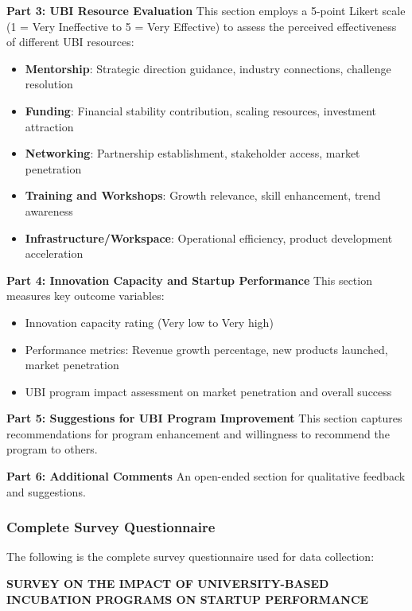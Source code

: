 \documentclass[../Main.tex]{subfiles}%
\begin{document}
	\textbf{Part 3: UBI Resource Evaluation}
	This section employs a 5-point Likert scale (1 = Very Ineffective to 5 = Very Effective) to assess the perceived effectiveness of different UBI resources:
	\begin{itemize}
		\item \textbf{Mentorship}: Strategic direction guidance, industry connections, challenge resolution
		\item \textbf{Funding}: Financial stability contribution, scaling resources, investment attraction
		\item \textbf{Networking}: Partnership establishment, stakeholder access, market penetration
		\item \textbf{Training and Workshops}: Growth relevance, skill enhancement, trend awareness
		\item \textbf{Infrastructure/Workspace}: Operational efficiency, product development acceleration
	\end{itemize}
	
	\textbf{Part 4: Innovation Capacity and Startup Performance}
	This section measures key outcome variables:
	\begin{itemize}
		\item Innovation capacity rating (Very low to Very high)
		\item Performance metrics: Revenue growth percentage, new products launched, market penetration
		\item UBI program impact assessment on market penetration and overall success
	\end{itemize}
	
	\textbf{Part 5: Suggestions for UBI Program Improvement}
	This section captures recommendations for program enhancement and willingness to recommend the program to others.
	
	\textbf{Part 6: Additional Comments}
	An open-ended section for qualitative feedback and suggestions.
	
	\subsubsection{Complete Survey Questionnaire}
	The following is the complete survey questionnaire used for data collection:
	
	\begin{center}
	\textbf{SURVEY ON THE IMPACT OF UNIVERSITY-BASED INCUBATION PROGRAMS ON STARTUP PERFORMANCE}
	\end{center}
	
\end{document}

